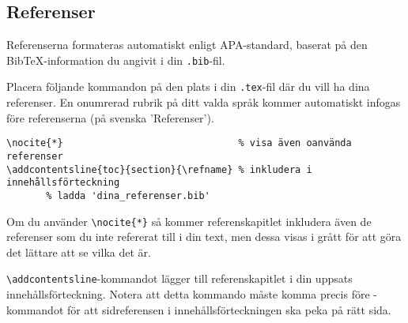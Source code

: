 





\subsection{Referenser}
\label{referenser}

Referenserna formateras automatiskt enligt APA-standard, baserat på den
BibTeX-information du angivit i din \verb|.bib|-fil.

Placera följande kommandon på den plats i din \verb|.tex|-fil där du vill ha
dina referenser. En onumrerad rubrik på ditt valda språk kommer automatiskt
infogas före referenserna (på svenska 'Referenser').

\begin{verbatim}
\nocite{*}                               % visa även oanvända referenser
\addcontentsline{toc}{section}{\refname} % inkludera i innehållsförteckning
       % ladda 'dina_referenser.bib'
\end{verbatim}

Om du använder \verb|\nocite{*}| så kommer referenskapitlet inkludera även de
referenser som du inte refererat till i din text, men dessa visas i grått för
att göra det lättare att se vilka det är.

\verb|\addcontentsline|-kommandot lägger till referenskapitlet i din uppsats
innehållsförteckning. Notera att detta kommando måste komma precis före
\verb||-kommandot för att sidreferensen i innehållsförteckningen
ska peka på rätt sida.

